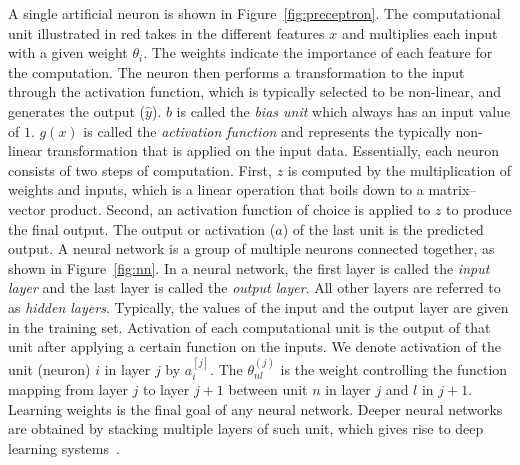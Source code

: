 A single artificial neuron is shown in Figure~\ref{fig:preceptron}. The computational unit illustrated in red takes in the different features $x$ and multiplies each input with a given weight $\theta_i$.
The weights indicate the importance of each feature for the computation. The neuron then performs a transformation to the input through the activation function, which is typically selected to be non-linear, and generates the output ($\hat { y } $).
$b$ is called the \emph{bias unit} which always has an input value of $1$. $g(x)$ is called the \emph{activation function} and represents the typically non-linear transformation that is applied on the input data. Essentially, each neuron consists of two steps of computation. First, $z$ is computed by the multiplication of weights and inputs, which is a linear operation that boils down to a matrix--vector product.
Second, an activation function of choice is applied to $z$ to produce the final output. The output or activation ($a$) of the last unit is the predicted output. A neural network is a group of multiple neurons connected together, as shown in Figure~\ref{fig:nn}. In a neural network, the first layer is called the \emph{input layer} and the last layer is called the \emph{output layer}. All other layers are referred to as \emph{hidden layers}.
Typically, the values of the input and the output layer are given in the training set. Activation of each computational unit is the output of that unit after applying a certain function on the inputs. We denote activation of the unit (neuron) $i$ in layer $j$ by $a_{i}^{[j]}$.
The $\theta^{(j)}_{nl}$ is the weight controlling the function mapping from layer $j$ to layer $j+1$ between unit $n$ in layer $j$ and $l$ in $j+1$. Learning weights is the final goal of any neural network. Deeper neural networks are obtained by stacking multiple layers of such unit, which gives rise to deep learning systems~. 
